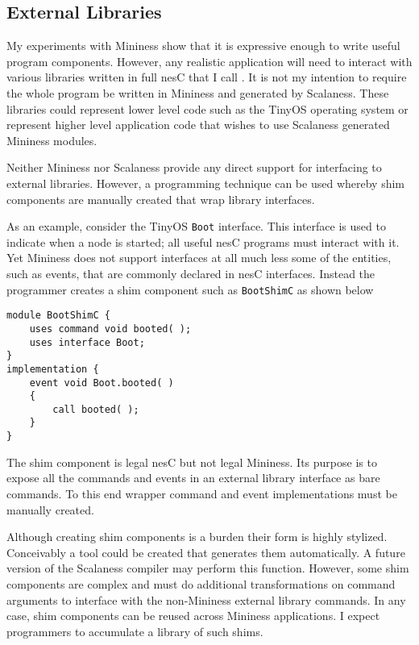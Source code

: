 \subsection{External Libraries}
\label{section-external-libraries-design}

My experiments with Mininess show that it is expressive enough to write useful program
components. However, any realistic application will need to interact with various libraries
written in full nesC that I call . It is not my intention to require
the whole program be written in Mininess and generated by Scalaness. These libraries could
represent lower level code such as the TinyOS operating system or represent higher level
application code that wishes to use Scalaness generated Mininess modules.

Neither Mininess nor Scalaness provide any direct support for interfacing to external libraries.
However, a programming technique can be used whereby shim components are manually created that
wrap library interfaces.

As an example, consider the TinyOS \lstinline!Boot! interface. This interface is used to
indicate when a node is started; all useful nesC programs must interact with it. Yet Mininess
does not support interfaces at all much less some of the entities, such as events, that are
commonly declared in nesC interfaces. Instead the programmer creates a shim component such as
\lstinline!BootShimC! as shown below

\singlespace
\vspace{1.0ex}
\begin{lstlisting}[language=nesC]
module BootShimC {
    uses command void booted( );
    uses interface Boot;
}
implementation {
    event void Boot.booted( )
    {
        call booted( );
    }
}
\end{lstlisting}
\vspace{1.0ex}
\primaryspacing

The shim component is legal nesC but not legal Mininess. Its purpose is to expose all the
commands and events in an external library interface as bare commands. To this end wrapper
command and event implementations must be manually created.

Although creating shim components is a burden their form is highly stylized. Conceivably a tool
could be created that generates them automatically. A future version of the Scalaness compiler
may perform this function. However, some shim components are complex and must do additional
transformations on command arguments to interface with the non-Mininess external library
commands. In any case, shim components can be reused across Mininess applications. I expect
programmers to accumulate a library of such shims.

